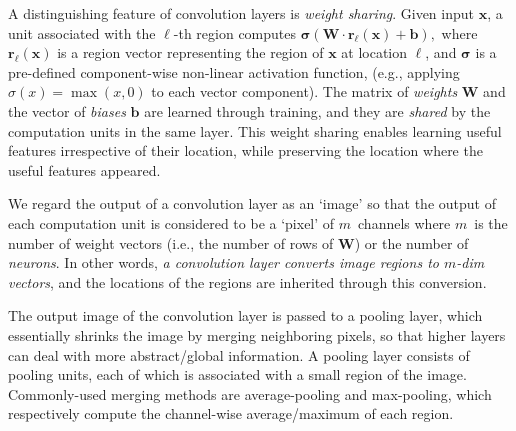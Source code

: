 \documentclass[11pt,letterpaper]{article}
\newcommand{\bx}{{\mathbf x}}
\newcommand{\Activ}{\boldsymbol{\sigma}}
\newcommand{\activ}{\sigma}
\newcommand{\ip}[2]{{#1} \cdot {#2}} %
\newcommand{\Wei}{{\mathbf W}}
\newcommand{\Bias}{{\mathbf b}}
\newcommand{\region}{{\mathbf r}} %
\newcommand{\iL}{\ell} %
\begin{document}
A distinguishing feature of convolution layers is {\em weight sharing}. 
Given input $\bx$, a unit associated with the $\iL$-th region computes 
$
\Activ(\ip{\Wei}{\region_\iL(\bx)}+\Bias), 
$
where $\region_\iL(\bx)$ is a region vector representing the region of $\bx$ 
at location $\ell$, 
and $\Activ$ is a pre-defined component-wise non-linear activation function, 
(e.g., applying $\activ(x)=\max(x,0)$ to each vector component).  
The matrix of {\em weights} $\Wei$ and the vector of {\em biases} $\Bias$ are 
learned through training, and they are {\em shared} by the computation units 
in the same layer.  
This weight sharing enables learning 
useful features irrespective of their location, while preserving the 
location where the useful features appeared.  

\newcommand{\numNeurono}{m}
\newcommand{\numNeuron}{$\numNeurono$}
We regard the output of a convolution layer as an `image' so that the output of 
each computation unit is considered to be a `pixel' of \numNeuron\ channels 
where \numNeuron\ is the number of weight vectors (i.e., the number of 
rows of $\Wei$) or the number of {\em neurons}. 
In other words, {\em a convolution layer converts image regions to 
\numNeuron-dim vectors}, %
and the locations of the regions are inherited through this conversion.  
%

The output image of the convolution layer is passed to a pooling layer, 
which essentially shrinks the image by merging neighboring pixels, so that higher layers can deal with 
more abstract/global information.  
A pooling layer consists of pooling units, each of which is associated with a small region 
of the image.  %
Commonly-used merging methods are average-pooling and max-pooling, 
which respectively compute the channel-wise average/maximum of each region.  
\end{document}
